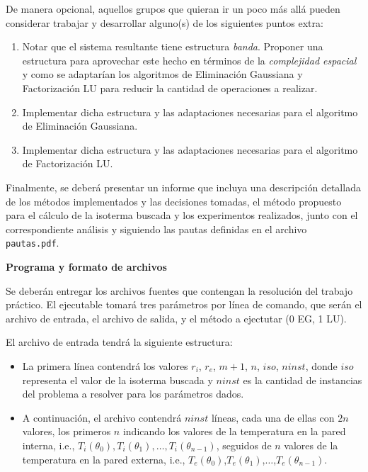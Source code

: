De manera opcional, aquellos grupos que quieran ir un poco m\'as all\'a pueden considerar trabajar y desarrollar alguno(s) 
de los siguientes puntos extra:
\begin{enumerate}
\item Notar que el sistema resultante tiene estructura \emph{banda}. Proponer una estructura para aprovechar este hecho en t\'erminos de la
\emph{complejidad espacial} y como se adaptar\'ian los algoritmos de Eliminaci\'on Gaussiana y Factorizaci\'on LU para reducir la
cantidad de operaciones a realizar.
\item Implementar dicha estructura y las adaptaciones necesarias para el algoritmo de Eliminaci\'on Gaussiana.
\item Implementar dicha estructura y las adaptaciones necesarias para el algoritmo de Factorizaci\'on LU. 
\end{enumerate}

Finalmente, se deber\'a presentar un informe que incluya una descripci\'on detallada de los m\'etodos implementados y
las decisiones tomadas, el m\'etodo propuesto para el c\'alculo de la isoterma buscada y los experimentos realizados,
junto con el correspondiente an\'alisis y siguiendo las pautas definidas en el archivo \verb+pautas.pdf+.

{\bf Programa y formato de archivos}

Se deber\'an entregar los archivos fuentes que contengan la resoluci\'on del trabajo pr\'actico. El ejecutable tomar\'a
tres par\'ametros por l\'inea de comando, que ser\'an el archivo de entrada, el archivo de salida, y el m\'etodo a
ejectutar (0 EG, 1 LU).

El archivo de entrada tendr\'a la siguiente estructura:
\begin{itemize}
\item La primera l\'inea contendr\'a los valores $r_i$, $r_e$, $m+1$, $n$, $iso$, $ninst$, donde $iso$ representa el
valor de la isoterma buscada y $ninst$ es la cantidad de instancias del problema a resolver para los par\'ametros dados.
\item A continuaci\'on, el archivo contendr\'a $ninst$ l\'ineas, cada una de ellas con $2n$ valores, los primeros $n$ indicando los
valores de la temperatura en la pared interna, i.e., $T_i(\theta_0),T_i(\theta_1),\dots,T_i(\theta_{n-1})$, seguidos de $n$ valores
de la temperatura en la pared externa, i.e., $T_e(\theta_0)$,$T_e(\theta_1)$,$\dots$,$T_e(\theta_{n-1})$.
\end{itemize}

